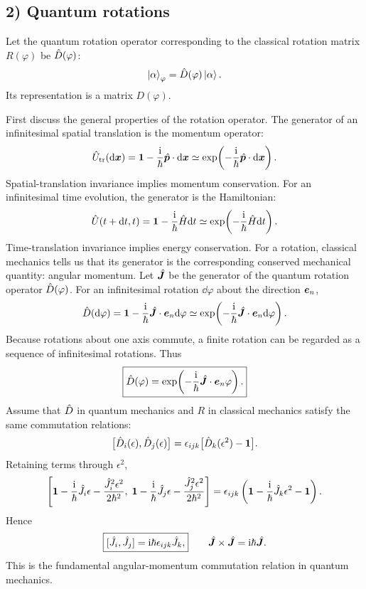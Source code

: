 \subsection*{2) Quantum rotations}
Let the quantum rotation operator corresponding to the classical rotation matrix $R(\varphi)$ be $\hat{D}(\varphi)$:
\begin{equation}
\left|\alpha\right\rangle_\varphi=\hat{D}(\varphi)\left|\alpha\right\rangle.
\end{equation}
Its representation is a matrix $D(\varphi)$.

First discuss the general properties of the rotation operator. The generator of an infinitesimal spatial translation is the momentum operator:
\begin{equation}
\hat{U}_{\mathrm{tr}}(\mathrm{d}\bm{x})=\mathbf1-\frac{\mathrm{i}}{\hbar}\hat{\bm{p}}\cdot\mathrm{d}\bm{x}
\simeq\exp\!\left(-\frac{\mathrm{i}}{\hbar}\hat{\bm{p}}\cdot\mathrm{d}\bm{x}\right).
\end{equation}
Spatial-translation invariance implies momentum conservation. For an infinitesimal time evolution, the generator is the Hamiltonian:
\begin{equation}
\hat{U}(t+\mathrm{d} t,t)=\mathbf1-\frac{\mathrm{i}}{\hbar}\hat{H}\mathrm{d} t
\simeq\exp\!\left(-\frac{\mathrm{i}}{\hbar}\hat{H}\mathrm{d} t\right).
\end{equation}
Time-translation invariance implies energy conservation. For a rotation, classical mechanics tells us that its generator is the corresponding conserved mechanical quantity: angular momentum. Let $\hat{\bm{J}}$ be the generator of the quantum rotation operator $\hat{D}(\varphi)$. For an infinitesimal rotation $\dd\varphi$ about the direction $\bm{e}_n$,
\begin{equation}
\hat{D}(\mathrm{d}\varphi)=\mathbf1-\frac{\mathrm{i}}{\hbar}\hat{\bm{J}}\cdot\bm{e}_n\mathrm{d}\varphi
\simeq\exp\!\left(-\frac{\mathrm{i}}{\hbar}\hat{\bm{J}}\cdot\bm{e}_n\mathrm{d}\varphi\right).
\end{equation}
Because rotations about one axis commute, a finite rotation can be regarded as a sequence of infinitesimal rotations. Thus
\begin{equation}
\boxed{\hat{D}(\varphi)=\exp\!\left(-\frac{\mathrm{i}}{\hbar}\hat{\bm{J}}\cdot\bm{e}_n\varphi\right).}
\end{equation}
Assume that $\hat{D}$ in quantum mechanics and $R$ in classical mechanics satisfy the same commutation relations:
\begin{equation}
\big[\hat{D}_i(\epsilon),\hat{D}_j(\epsilon)\big]
=\epsilon_{ijk}\big[\hat{D}_k(\epsilon^2)-\mathbf1\big].
\end{equation}
Retaining terms through $\epsilon^2$,
\begin{equation}
\left[\mathbf1-\frac{\mathrm{i}}{\hbar}\hat{J}_i\epsilon-\frac{\hat{J}_i^2\epsilon^2}{2\hbar^2},\;
\mathbf1-\frac{\mathrm{i}}{\hbar}\hat{J}_j\epsilon-\frac{\hat{J}_j^2\epsilon^2}{2\hbar^2}\right]
=\epsilon_{ijk}\left(\mathbf1-\frac{\mathrm{i}}{\hbar}\hat{J}_k\epsilon^2-\mathbf1\right).
\end{equation}
Hence
\begin{equation}
\boxed{[\hat{J}_i,\hat{J}_j]=\mathrm{i}\hbar\epsilon_{ijk}\hat{J}_k,}\qquad
\hat{\bm{J}}\times\hat{\bm{J}}=\mathrm{i}\hbar\hat{\bm{J}}.
\end{equation}
This is the fundamental angular-momentum commutation relation in quantum mechanics.

